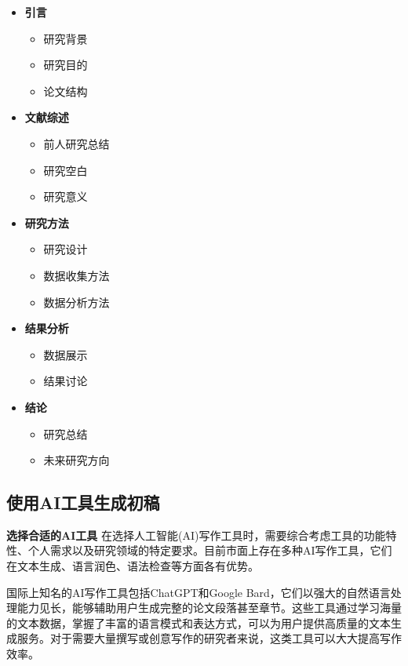\begin{itemize}
    \item \textbf{引言}
    \begin{itemize}
        \item 研究背景
        \item 研究目的
        \item 论文结构
    \end{itemize}
    \item \textbf{文献综述}
    \begin{itemize}
        \item 前人研究总结
        \item 研究空白
        \item 研究意义
    \end{itemize}
    \item \textbf{研究方法}
    \begin{itemize}
        \item 研究设计
        \item 数据收集方法
        \item 数据分析方法
    \end{itemize}
    \item \textbf{结果分析}
    \begin{itemize}
        \item 数据展示
        \item 结果讨论
    \end{itemize}
    \item \textbf{结论}
    \begin{itemize}
        \item 研究总结
        \item 未来研究方向
    \end{itemize}
\end{itemize}

\subsection{使用AI工具生成初稿}
\textbf{选择合适的AI工具}
在选择人工智能(AI)写作工具时，需要综合考虑工具的功能特性、个人需求以及研究领域的特定要求。目前市面上存在多种AI写作工具，它们在文本生成、语言润色、语法检查等方面各有优势。

国际上知名的AI写作工具包括ChatGPT和Google Bard，它们以强大的自然语言处理能力见长，能够辅助用户生成完整的论文段落甚至章节。这些工具通过学习海量的文本数据，掌握了丰富的语言模式和表达方式，可以为用户提供高质量的文本生成服务。对于需要大量撰写或创意写作的研究者来说，这类工具可以大大提高写作效率。

